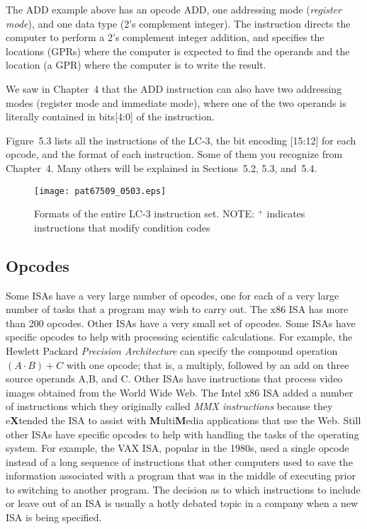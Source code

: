 \documentclass{patt}
\begin{document}
The ADD example above has an opcode ADD, one addressing mode ({\em register 
mode}), and one data type (2's complement integer).  The instruction directs 
the computer to perform a 2's complement integer addition, and specifies the 
locations (GPRs) where the computer is expected to find the operands and the 
location (a GPR) where the computer is to write the result.

We saw in Chapter~4 that the ADD instruction can also have two
addressing modes (register mode and immediate mode), where one of
the two operands is literally contained in bits[4:0] of the instruction.

Figure~5.3 lists all the instructions of the LC-3, the
bit encoding [15:12] for each opcode, and the format of each
instruction.  Some of them you recognize from Chapter~4.  Many others will be 
explained in Sections~5.2, 5.3, and~5.4.

\begin{figure}
\centerline{\texttt{[image: pat67509\_0503.eps]}}
\caption{Formats of the entire LC-3 instruction set. NOTE:
$^{+}$ indicates instructions that modify condition codes\label{fig:inst_formats}}
\end{figure}

\FloatBarrier
\subsection{Opcodes}

Some ISAs have a very large number of opcodes, one for each of a very large 
number of tasks that a program may wish to carry out. The x86 
ISA has more than 200 opcodes.  Other ISAs have a very small set of opcodes. 
Some ISAs have specific opcodes to help with processing scientific calculations.
For example, the Hewlett Packard {\em Precision Architecture} can specify 
the compound operation $(A\cdot B)+C$ with one opcode; that is, a multiply, 
followed by an add on three source operands A,B, and C.  Other ISAs have 
instructions that process video images obtained from the World Wide Web. 
The Intel x86 ISA added a number of instructions which they originally 
called {\em MMX instructions} because they e{\bf X}tended the ISA to assist
with {\bf M}ulti{\bf M}edia applications that use the Web.  Still other ISAs
have specific opcodes to help with handling the tasks of the operating system. 
For example, the VAX ISA, popular in the 1980s, used a single opcode instead of
a long sequence of instructions that other computers used to save the 
information associated with a program that was in the middle of executing 
prior to switching to another program.  The decision as to which instructions 
to include or leave out of an ISA is usually a hotly debated topic in a 
company when a new ISA is being specified.
\end{document}
